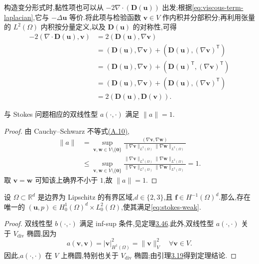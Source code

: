 \begin{note}[黏性项的速度形变率张量形式]\label{note:stokes-deformation-tensor}
构造变分形式时,黏性项也可以从 $-2\nabla\cdot(\bm{D}(\bm{u}))$ 出发;根据\cref{eq:viscous-term-laplacian},它与 $-\Delta\bm{u}$ 等价.将此项与检验函数 $\bm{v}\in V$ 作内积并分部积分;再利用张量的 $L^2(\Omega)$ 内积按分量定义,以及 $\bm{D}(\bm{u})$ 的对称性,可得
\begin{equation}\label{eq:stokes-deformation-tensor-form}
\begin{aligned}
  -2(\nabla\cdot\bm{D}(\bm{u}),\bm{v})
   &=2(\bm{D}(\bm{u}),\nabla\bm{v})\\
   &=(\bm{D}(\bm{u}),\nabla\bm{v})
      +(\bm{D}(\bm{u}),(\nabla\bm{v})^\mathsf{T})\\
   &=(\bm{D}(\bm{u}),\nabla\bm{v})
      +(\bm{D}(\bm{u})^\mathsf{T},(\nabla\bm{v})^\mathsf{T})\\
   &=(\bm{D}(\bm{u}),\nabla\bm{v})
      +(\bm{D}(\bm{u}),(\nabla\bm{v})^\mathsf{T})\\
   &=2(\bm{D}(\bm{u}),\bm{D}(\bm{v})).
\end{aligned}
\end{equation}
\end{note}

\begin{lemma}\label{lem:stokes-bilinear-form-norm}
与 Stokes 问题相应的双线性型 $a(\cdot,\cdot)$ 满足 $\|a\|=1$.
\end{lemma}
\begin{proof}
由 Cauchy--Schwarz 不等式\hyperref[eq:appendix-a-10]{(A.10)},
\[
\begin{aligned}
  \|a\|
   &=\sup_{\bm{v},\bm{w}\in V\setminus\{\bm{0}\}}
      \frac{(\nabla\bm{v},\nabla\bm{w})}
      {\|\nabla\bm{v}\|_{L^2(\Omega)}
       \|\nabla\bm{w}\|_{L^2(\Omega)}}\\
   &\leq\sup_{\bm{v},\bm{w}\in V\setminus\{\bm{0}\}}
      \frac{\|\nabla\bm{v}\|_{L^2(\Omega)}
            \|\nabla\bm{w}\|_{L^2(\Omega)}}
      {\|\nabla\bm{v}\|_{L^2(\Omega)}
       \|\nabla\bm{w}\|_{L^2(\Omega)}}=1.
\end{aligned}
\]
取 $\bm{v}=\bm{w}$ 可知该上确界不小于 $1$,故 $\|a\|=1$.
\end{proof}

\begin{theorem}\label{thm:stokes-4-6}
设 $\Omega\subset\mathbb{R}^d$ 是边界为 Lipschitz 的有界区域,$d\in\{2,3\}$,且 $\bm{f}\in H^{-1}(\Omega)^d$.那么,存在唯一的 $(\bm{u},p)\in H_0^1(\Omega)^d\times L_0^2(\Omega)$,使其满足\cref{eq:stokes-weak}.
\end{theorem}
\begin{proof}
双线性型 $b(\cdot,\cdot)$ 满足 inf-sup 条件,见定理\hyperref[thm:infsup-v-q]{3.46}.此外,双线性型 $a(\cdot,\cdot)$ 关于 $V_{\mathrm{div}}$ 椭圆,因为
\begin{equation}\label{eq:stokes-ellipticity}
  a(\bm{v},\bm{v})
    =|\bm{v}|_{H^1(\Omega)}^2
    =\|\bm{v}\|_V^2
    \quad\forall\bm{v}\in V.
\end{equation}
因此,$a(\cdot,\cdot)$ 在 $V$ 上椭圆,特别也关于 $V_{\mathrm{div}}$ 椭圆;由引理\hyperref[lem:sufficient-condition-ellipticity]{3.19}得到定理结论.
\end{proof}

